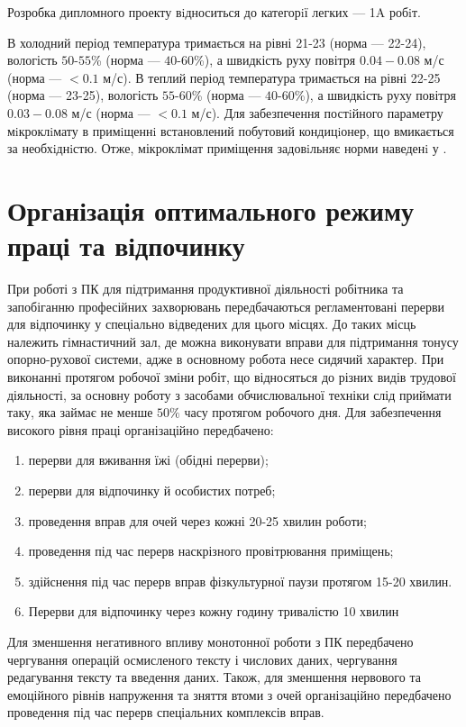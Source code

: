 Розробка дипломного проекту вiдноситься до категорiї легких --- 1A робiт.

В холодний період температура тримається на рівні 21-23 (норма --- 22-24),
вологість $50$-$55$\% (норма --- $40$-$60$\%), а швидкість руху повітря
$0.04-0.08$ м/с (норма --- $<0.1$ м/с).
В теплий період температура тримається на рівні 22-25 (норма --- 23-25),
вологість $55$-$60$\% (норма --- $40$-$60$\%), а швидкість руху повітря
$0.03-0.08$ м/с (норма --- $<0.1$ м/с).
Для забезпечення постiйного параметру мiкроклiмату в примiщеннi встановлений
побутовий кондицiонер, що вмикається за необхiднiстю.
Отже, мікроклімат приміщення задовiльняє норми наведенi у \cite{DSN}.

\section{Організація оптимального режиму праці та відпочинку}

При роботі з ПК для підтримання продуктивної діяльності робітника та запобіганню
професійних захворювань передбачаються регламентовані перерви для відпочинку
у спеціально відведених для цього місцях.
До таких місць належить гімнастичний зал, де можна виконувати вправи
для підтримання тонусу опорно-рухової системи, 
адже в основному робота несе сидячий характер.
При виконанні протягом робочої зміни робіт, що відносяться до різних видів
трудової діяльності, за основну роботу з засобами обчислювальної техніки
слід приймати таку, яка займає не менше $50\%$ часу протягом робочого дня.
Для забезпечення високого рівня праці організаційно передбачено:
\begin{enumerate}
\item перерви для  вживання їжі (обідні перерви);
\item перерви для відпочинку й особистих потреб;
\item проведення вправ для очей через кожні 20-25 хвилин роботи;
\item проведення під час перерв наскрізного провітрювання приміщень;
\item здійснення під час перерв вправ фізкультурної паузи протягом 15-20 хвилин.
\item Перерви для відпочинку через кожну годину тривалістю 10 хвилин
\end{enumerate}
Для зменшення негативного впливу монотонної роботи з ПК передбачено чергування
операцій осмисленого тексту і числових даних, чергування редагування тексту та
введення даних.
Також, для зменшення  нервового та емоційного рівнів напруження та зняття втоми
з очей організаційно передбачено проведення під час перерв спеціальних
комплексів вправ.

